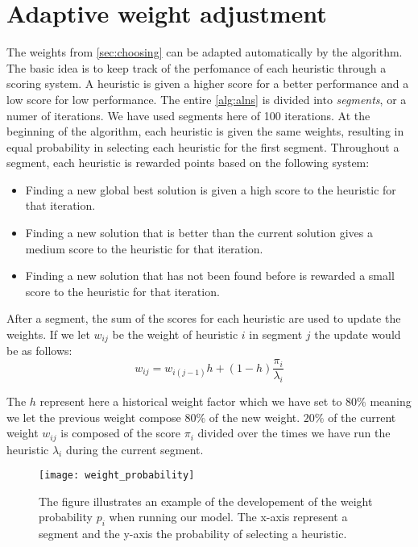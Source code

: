 \documentclass[../main.tex]{subfiles}
\begin{document}
\section{Adaptive weight adjustment}
\label{sec:weight}
The weights from \cref{sec:choosing} can be adapted automatically by the algorithm. 
The basic idea is to keep track of the perfomance of each heuristic through a scoring system. 
A heuristic is given a higher score for a better performance and a low score for low performance. 
The entire \cref{alg:alns} is divided into \textit{segments}, or a numer of iterations. 
We have used segments here of 100 iterations.
At the beginning of the algorithm, each heuristic is given the same weights, resulting in equal probability in selecting each heuristic for the first segment.
Throughout a segment, each heuristic is rewarded points based on the following system:
\begin{itemize}
    \item Finding a new global best solution is given a high score to the heuristic for that iteration.
    \item Finding a new solution that is better than the current solution gives a medium score to the heuristic for that iteration.
    \item Finding a new solution that has not been found before is rewarded a small score to the heuristic for that iteration.
\end{itemize}
After a segment, the sum of the scores for each heuristic are used to update the weights. If we let $w_{ij}$ be the weight of heuristic $i$ in segment $j$ the update would be as follows:
\begin{equation}\label{eq:update}
    w_{ij} = w_{i(j-1)}h + (1-h)\dfrac{\pi_i}{\lambda_i}
\end{equation}

The $h$ represent here a historical weight factor which we have set to $80\%$ meaning we let the previous weight compose $80\%$ of the new weight. 
$20\%$ of the current weight $w_{ij}$ is composed of the score $\pi_i$ divided over the times we have run the heuristic $\lambda_i$ during the current segment.

\begin{figure}                                                                    
    \centering                                                                                     
    \texttt{[image: weight\_probability]}                                     
    \caption{The figure illustrates an example of the developement of the weight probability $p_i$ when running our model. The x-axis represent a segment and the y-axis the probability of selecting a heuristic.}
    \label{fig:weights}
\end{figure}
\end{document}
